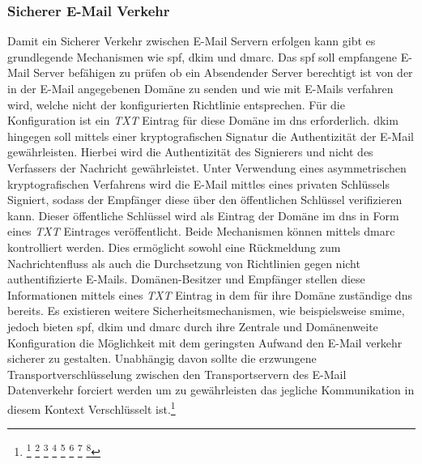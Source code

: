 \documentclass[11pt,a4paper,hidelinks]{article}   %
\begin{document}
            \subsubsection{Sicherer E-Mail Verkehr}
            Damit ein Sicherer Verkehr zwischen E-Mail Servern erfolgen kann gibt es grundlegende Mechanismen wie \gls{spf}, \gls{dkim} und \gls{dmarc}. Das \gls{spf} soll empfangene E-Mail Server befähigen zu prüfen ob ein Absendender Server berechtigt ist von der in der E-Mail angegebenen Domäne zu senden und wie mit E-Mails verfahren wird, welche nicht der konfigurierten Richtlinie entsprechen. Für die Konfiguration ist ein \emph{TXT} Eintrag für diese Domäne im \gls{dns} erforderlich. \gls{dkim} hingegen soll mittels einer kryptografischen Signatur die Authentizität der E-Mail gewährleisten. Hierbei wird die Authentizität des Signierers und nicht des Verfassers der Nachricht gewährleistet. Unter Verwendung eines asymmetrischen kryptografischen Verfahrens wird die E-Mail mittles eines privaten Schlüssels Signiert, sodass der Empfänger diese über den öffentlichen Schlüssel verifizieren kann. Dieser öffentliche Schlüssel wird als Eintrag der Domäne im \gls{dns} in Form eines \emph{TXT} Eintrages veröffentlicht. Beide Mechanismen können mittels \gls{dmarc} kontrolliert werden. Dies ermöglicht sowohl eine Rückmeldung zum Nachrichtenfluss als auch die Durchsetzung von Richtlinien gegen nicht authentifizierte E-Mails. Domänen-Besitzer und Empfänger stellen diese Informationen mittels eines \emph{TXT} Eintrag in dem für ihre Domäne zuständige \gls{dns} bereits. Es existieren weitere Sicherheitsmechanismen, wie beispielsweise \gls{smime}, jedoch bieten \gls{spf}, \gls{dkim} und \gls{dmarc} durch ihre Zentrale und Domänenweite Konfiguration die Möglichkeit mit dem geringsten Aufwand den E-Mail verkehr sicherer zu gestalten. Unabhängig davon sollte die erzwungene Transportverschlüsselung zwischen den Transportservern des E-Mail Datenverkehr forciert werden um zu gewährleisten das jegliche Kommunikation in diesem Kontext Verschlüsselt ist.\footnote{
                \footcite[][1. Introduction]{RFC7208}
                \footcite[][3. SPF Records]{RFC7208}
                \footcite[][3.1. DNS Resource Records]{RFC7208}
                \footcite[][1]{RFC6376}
                \footcite[][5.1]{RFC5585}
                \footcite[][4.1]{RFC5863}
                \footcite[][1]{RFC8551}
                \footcite[1][]{RFC8689}
            }
\end{document}
